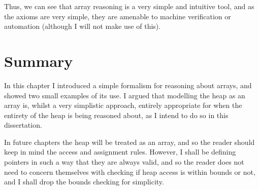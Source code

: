 Thus, we can see that array reasoning is a very simple and intuitive
tool, and as the axioms are very simple, they are amenable to machine
verification or automation (although I will not make use of this).

\section{Summary}
\label{sec:heap-summary}

In this chapter I introduced a simple formalism for reasoning about
arrays, and showed two small examples of its use. I argued that
modelling the heap as an array is, whilst a very simplistic approach,
entirely appropriate for when the entirety of the heap is being
reasoned about, as I intend to do so in this dissertation.

In future chapters the heap will be treated as an array, and so the
reader should keep in mind the access and assignment rules. However, I
shall be defining pointers in such a way that they are always valid,
and so the reader does not need to concern themselves with checking if
heap access is within bounds or not, and I shall drop the bounds
checking for simplicity.
